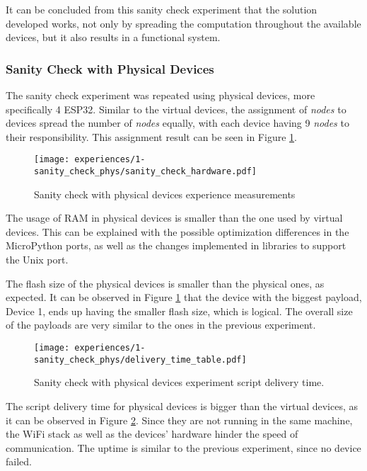 It can be concluded from this sanity check experiment that the solution developed works, not only by spreading the computation throughout the available devices, but it also results in a functional system.


\subsubsection{Sanity Check with Physical Devices}\label{sec:sanity_check_phys_exp}

The sanity check experiment was repeated using physical devices, more specifically 4 ESP32. Similar to the virtual devices, the assignment of \textit{nodes} to devices spread the number of \textit{nodes} equally, with each device having 9 \textit{nodes} to their responsibility. This assignment result can be seen in Figure \ref{fig:sanity_check_phys_graph}.

\begin{figure}[h]
\centering
\texttt{[image: experiences/1-sanity\_check\_phys/sanity\_check\_hardware.pdf]}
\caption[Sanity check with physical devices experience measurements]{Sanity check with physical devices experience measurements}\label{fig:sanity_check_phys_graph}
\end{figure}

The usage of RAM in physical devices is smaller than the one used by virtual devices. This can be explained with the possible optimization differences in the MicroPython ports, as well as the changes implemented in libraries to support the Unix port.

The flash size of the physical devices is smaller than the physical ones, as expected. It can be observed in Figure \ref{fig:sanity_check_phys_graph} that the device with the biggest payload, Device 1, ends up having the smaller flash size, which is logical. The overall size of the payloads are very similar to the ones in the previous experiment. 

\begin{figure}[h]
\centering
\texttt{[image: experiences/1-sanity\_check\_phys/delivery\_time\_table.pdf]}
\caption[Sanity check with physical devices experiment script delivery time.]{Sanity check with physical devices experiment script delivery time.}\label{fig:sanity_check_phys_delivery_time}
\end{figure}

The script delivery time for physical devices is bigger than the virtual devices, as it can be observed in Figure \ref{fig:sanity_check_phys_delivery_time}. Since they are not running in the same machine, the WiFi stack as well as the devices' hardware hinder the speed of communication. The uptime is similar to the previous experiment, since no device failed.

